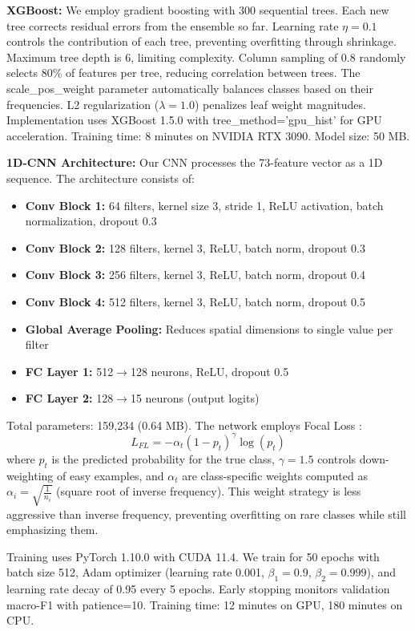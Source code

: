\documentclass[10pt,twocolumn]{article}
\begin{document}
\textbf{XGBoost:} We employ gradient boosting with 300 sequential trees. Each new tree corrects residual errors from the ensemble so far. Learning rate $\eta=0.1$ controls the contribution of each tree, preventing overfitting through shrinkage. Maximum tree depth is 6, limiting complexity. Column sampling of 0.8 randomly selects 80\% of features per tree, reducing correlation between trees. The scale\_pos\_weight parameter automatically balances classes based on their frequencies. L2 regularization ($\lambda=1.0$) penalizes leaf weight magnitudes. Implementation uses XGBoost 1.5.0 with tree\_method='gpu\_hist' for GPU acceleration. Training time: 8 minutes on NVIDIA RTX 3090. Model size: 50 MB.


\textbf{1D-CNN Architecture:} Our CNN processes the 73-feature vector as a 1D sequence. The architecture consists of:
\begin{itemize}
    \item \textbf{Conv Block 1:} 64 filters, kernel size 3, stride 1, ReLU activation, batch normalization, dropout 0.3
    \item \textbf{Conv Block 2:} 128 filters, kernel 3, ReLU, batch norm, dropout 0.3
    \item \textbf{Conv Block 3:} 256 filters, kernel 3, ReLU, batch norm, dropout 0.4
    \item \textbf{Conv Block 4:} 512 filters, kernel 3, ReLU, batch norm, dropout 0.5
    \item \textbf{Global Average Pooling:} Reduces spatial dimensions to single value per filter
    \item \textbf{FC Layer 1:} 512$\rightarrow$128 neurons, ReLU, dropout 0.5
    \item \textbf{FC Layer 2:} 128$\rightarrow$15 neurons (output logits)
\end{itemize}

Total parameters: 159,234 (0.64 MB). The network employs Focal Loss \cite{lin2017focal}: 
$$L_{FL} = -\alpha_t (1-p_t)^\gamma \log(p_t)$$
where $p_t$ is the predicted probability for the true class, $\gamma=1.5$ controls down-weighting of easy examples, and $\alpha_t$ are class-specific weights computed as $\alpha_i = \sqrt{\frac{1}{n_i}}$ (square root of inverse frequency). This weight strategy is less aggressive than inverse frequency, preventing overfitting on rare classes while still emphasizing them.

Training uses PyTorch 1.10.0 with CUDA 11.4. We train for 50 epochs with batch size 512, Adam optimizer (learning rate 0.001, $\beta_1=0.9$, $\beta_2=0.999$), and learning rate decay of 0.95 every 5 epochs. Early stopping monitors validation macro-F1 with patience=10. Training time: 12 minutes on GPU, 180 minutes on CPU.
\end{document}

